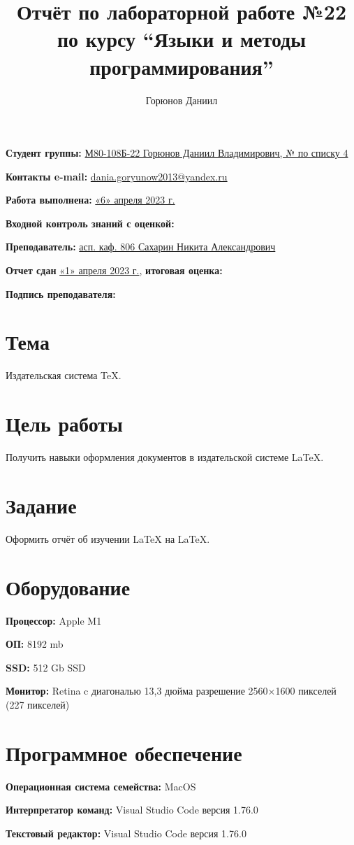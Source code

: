 \documentclass[12pt, letterpaper]{article}
\title{Отчёт по лабораторной работе №22 по курсу “Языки и методы программирования”}
\author{Горюнов Даниил}
\begin{document}
\maketitle
\begin{description}
\item\textbf{Студент группы:} \underline{М80-108Б-22 Горюнов Даниил Владимирович, № по списку 4}    
\item\textbf{Контакты e-mail:} \underline{dania.goryunow2013@yandex.ru}
\item\textbf{Работа выполнена:} \underline{«6» апреля 2023 г.}
\item\textbf{Входной контроль знаний с оценкой:} 
\item\textbf{Преподаватель:} \underline{асп. каф. 806 Сахарин Никита Александрович}
\item\textbf{Отчет сдан} \underline{«1» апреля 2023 г.}, \textbf{итоговая оценка:}
\item\textbf{Подпись преподавателя:} \underline{\hspace{3cm}}
\end{description}
\section{Тема}
Издательская система \TeX{}.
\section{Цель работы}
Получить навыки оформления документов в издательской системе \LaTeX{}.
\section{Задание}
Оформить отчёт об изучении \LaTeX{} на \LaTeX{}.
\section{Оборудование}
\begin{description}
\item\textbf{Процессор:} Apple M1
\item\textbf{ОП:} 8192 mb
\item\textbf{SSD:} 512 Gb SSD
\item\textbf{Монитор:} Retina c диагональю 13,3 дюйма разрешение 2560×1600 пикселей (227 пикселей)
\end{description}
\section{Программное обеспечение}
\begin{description}
\item\textbf{Операционная система семейства:} MacOS
\item\textbf{Интерпретатор команд:} Visual Studio Code версия 1.76.0
\item\textbf{Текстовый редактор:} Visual Studio Code версия 1.76.0
\end{description}
\end{document}
